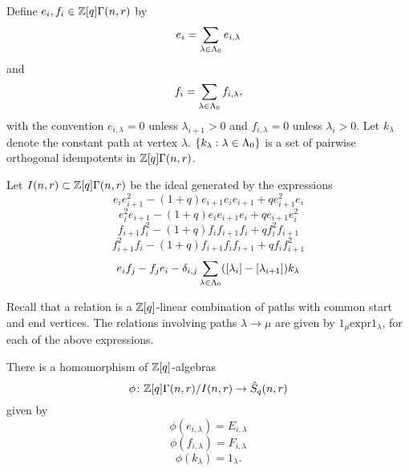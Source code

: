 \documentclass[a4paper, 11pt]{report}
\begin{document}
Define $e_i, f_i\in\mathbb{Z}[q]\Gamma(n,r)$ by
\begin{equation*}
e_i = \sum_{\lambda\in{\Lambda_0}} e_{i,\lambda}
\end{equation*}
and
\begin{equation*}
f_i = \sum_{\lambda\in{\Lambda_0}} f_{i,\lambda},
\end{equation*}
with the convention $e_{i,\lambda} = 0$ unless $\lambda_{i+1}>0$ and $f_{i,\lambda} = 0$ unless $\lambda_i>0$. Let $k_\lambda$ denote the constant path at vertex $\lambda$. $\{k_\lambda:\lambda\in{\Lambda_0}\}$ is a set of pairwise orthogonal idempotents in $\mathbb{Z}[q]\Gamma(n,r)$.

Let $I(n,r)\subset\mathbb{Z}[q]\Gamma(n,r)$ be the ideal generated by the expressions
\begin{equation*}
e_i e_{i+1}^2 -(1+q)e_{i+1}e_ie_{i+1} + qe_{i+1}^2e_i
\end{equation*}
\begin{equation*}
e_i^2e_{i+1} - (1+q) e_ie_{i+1}e_i + qe_{i+1}e_i^2
\end{equation*}
\begin{equation*}
f_{i+1}f_i^2 - (1+q)f_if_{i+1} f_i + qf_i^2f_{i+1}
\end{equation*}
\begin{equation*}
f_{i+1}^2f_i - (1+q)f_{i+1}f_if_{i+1} + qf_if_{i+1}^2
\end{equation*}
\begin{equation*}
e_if_j - f_je_i - \delta_{i,j} \sum_{\lambda\in{\Lambda_0}} ([\lambda_i]-[\lambda_{i+1}])k_\lambda
\end{equation*}

Recall that a relation is a $\mathbb{Z}[q]$-linear combination of paths with common start and end vertices. The relations involving paths $\lambda\to\mu$ are given by $1_\mu \text{expr} 1_\lambda$, for each of the above expressions.

\begin{lemma}
There is a homomorphism of $\mathbb{Z}[q]$-algebras
\begin{equation*}
\phi\colon\mathbb{Z}[q]\Gamma(n,r)/{I(n,r)}\to\hat{S}_q(n,r)
\end{equation*}
given by
\begin{equation*}
\phi(e_{i,\lambda}) = E_{i,\lambda}
\end{equation*}
\begin{equation*}
\phi(f_{i,\lambda}) = F_{i,\lambda}
\end{equation*}
\begin{equation*}
\phi(k_\lambda) = 1_\lambda.
\end{equation*}
\end{lemma}
\end{document}
